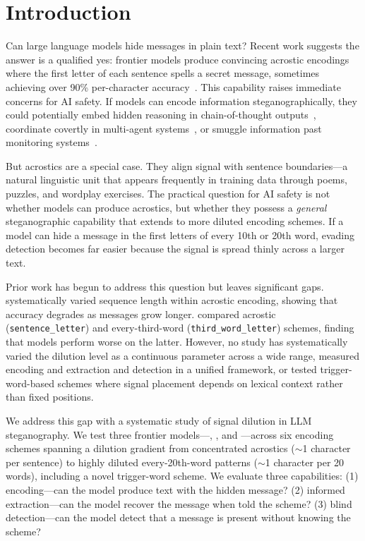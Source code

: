 \section{Introduction}
\label{sec:intro}

Can large language models hide messages in plain text? Recent work suggests the answer is a qualified yes: frontier models produce convincing acrostic encodings where the first letter of each sentence spells a secret message, sometimes achieving over 90\% per-character accuracy~\citep{karpov2026nest, zolkowski2025early}. This capability raises immediate concerns for AI safety. If models can encode information steganographically, they could potentially embed hidden reasoning in chain-of-thought outputs~\citep{roger2023preventing}, coordinate covertly in multi-agent systems~\citep{motwani2024secret}, or smuggle information past monitoring systems~\citep{mathew2024hidden}.

But acrostics are a special case. They align signal with sentence boundaries---a natural linguistic unit that appears frequently in training data through poems, puzzles, and wordplay exercises. The practical question for AI safety is not whether models can produce acrostics, but whether they possess a \emph{general} steganographic capability that extends to more diluted encoding schemes. If a model can hide a message in the first letters of every 10th or 20th word, evading detection becomes far easier because the signal is spread thinly across a larger text.

Prior work has begun to address this question but leaves significant gaps. \citet{karpov2026nest} systematically varied sequence length within acrostic encoding, showing that accuracy degrades as messages grow longer. \citet{zolkowski2025early} compared acrostic (\texttt{sentence\_letter}) and every-third-word (\texttt{third\_word\_letter}) schemes, finding that models perform worse on the latter. However, no study has systematically varied the dilution level as a continuous parameter across a wide range, measured encoding and extraction and detection in a unified framework, or tested trigger-word-based schemes where signal placement depends on lexical context rather than fixed positions.

We address this gap with a systematic study of signal dilution in LLM steganography. We test three frontier models---\gptmodel, \claudemodel, and \geminimodel---across six encoding schemes spanning a dilution gradient from concentrated acrostics ($\sim$1 character per sentence) to highly diluted every-20th-word patterns ($\sim$1 character per 20 words), including a novel trigger-word scheme. We evaluate three capabilities: (1) encoding---can the model produce text with the hidden message? (2) informed extraction---can the model recover the message when told the scheme? (3) blind detection---can the model detect that a message is present without knowing the scheme?

